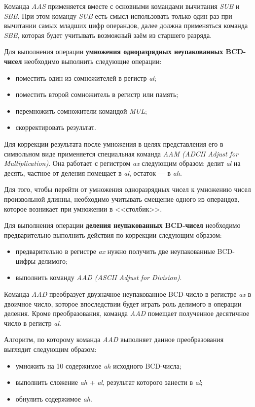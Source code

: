 Команда \textit{AAS} применяется вместе с основными командами вычитания \textit{SUB} и \textit{SBB}.
При этом команду \textit{SUB} есть смысл использовать только один раз при вычитании самых
младших цифр операндов, далее должна применяться команда \textit{SBB}, которая будет учитывать
возможный заём из старшего разряда.

Для выполнения операции \textbf{умножения одноразрядных неупакованных BCD-чисел} необходимо
выполнить следующие операции:
\begin{itemize}
  \item поместить один из сомножителей в регистр \textit{al};
  \item поместить второй сомножитель в регистр или память;
  \item перемножить сомножители командой \textit{MUL};
  \item скорректировать результат.
\end{itemize}

Для коррекции результата после умножения в целях представления его в символьном виде
применяется специальная команда \textit{AAM (ADCII Adjust for Multiplication)}. Она
работает с регистром \textit{ax} следующим образом: делит \textit{al} на десять, частное
от деления помещает в \textit{al}, остаток --- в \textit{ah}.

Для того, чтобы перейти от умножения одноразрядных чисел к умножению чисел произвольной
длинны, необходимо учитывать смещение одного из операндов, которое возникает при
умножении в <<столбик>>.

Для выполнения операции \textbf{деления неупакованных BCD-чисел} необходимо предварительно
выполнить действия по коррекции следующим образом:
\begin{itemize}
  \item предварительно в регистре \textit{ax} нужно получить две неупакованные
    BCD-цифры делимого;
  \item выполнить команду \textit{AAD (ASCII Adjust for Division)}.
\end{itemize}

Команда \textit{AAD} преобразует двузначное неупакованное BCD-число в регистре \textit{ax}
в двоичное число, которое впоследствии будет играть роль делимого в операции деления.
Кроме преобразования, команда \textit{AAD} помещает полученное десятичное число в регистр \textit{al}.

Алгоритм, по которому команда \textit{AAD} выполняет данное преобразования выглядит следующим образом:
\begin{itemize}
  \item умножить на 10 содержимое \textit{ah} исходного BCD-числа;
  \item выполнить сложение \textit{ah} + \textit{al}, результат которого занести в \textit{al};
  \item обнулить содержимое \textit{ah}.
\end{itemize}

